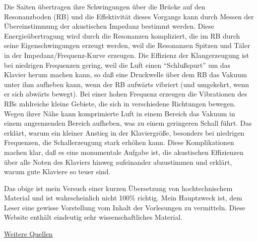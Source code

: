 Die Saiten übertragen ihre Schwingungen über die Brücke auf den Resonanzboden (RB) und die Effektivität dieses Vorgangs kann durch Messen der Übereinstimmung der akustischen Impedanz bestimmt werden.
Diese Energieübertragung wird durch die Resonanzen kompliziert, die im RB durch seine  Eigenschwingungen erzeugt werden, weil die Resonanzen Spitzen und Täler in der Impedanz/Frequenz-Kurve erzeugen.
Die Effizienz der Klangerzeugung ist bei niedrigen Frequenzen gering, weil die Luft einen \enquote{Schlußspurt} um das Klavier herum machen kann, so daß eine Druckwelle über dem RB das Vakuum unter ihm aufheben kann, wenn der RB aufwärts vibriert (und umgekehrt, wenn er sich abwärts bewegt).
Bei einer hohen Frequenz erzeugen die Vibrationen des RBs zahlreiche kleine Gebiete, die sich in verschiedene Richtungen bewegen.
Wegen ihrer Nähe kann komprimierte Luft in einem Bereich das Vakuum in einem angrenzenden Bereich aufheben, was zu einem geringeren Schall führt.
Das erklärt, warum ein kleiner Anstieg in der Klaviergröße, besonders bei niedrigen Frequenzen, die Schallerzeugung stark erhöhen kann.
Diese Komplikationen machen klar, daß es eine monumentale Aufgabe ist, die akustischen Effizienzen über alle Noten des Klaviers hinweg aufeinander abzustimmen und erklärt, warum gute Klaviere so teuer sind.

Das obige ist mein Versuch einer kurzen Übersetzung von hochtechnischem Material und ist wahrscheinlich nicht 100\% richtig.
Mein Hauptzweck ist, dem Leser eine gewisse Vorstellung vom Inhalt der Vorlesungen zu vermitteln.
Diese Website enthält eindeutig sehr wissenschaftliches Material.


\underline{Weitere Quellen}

